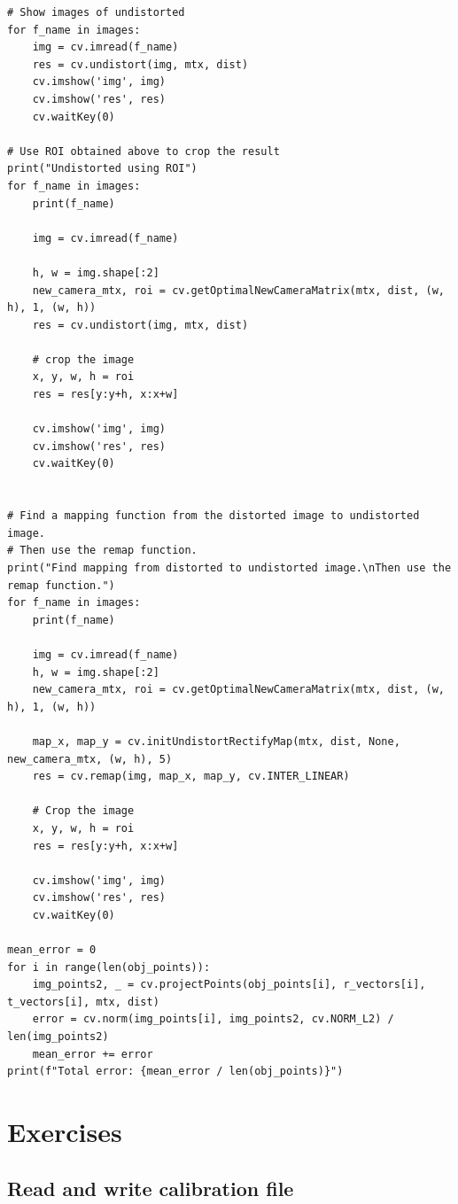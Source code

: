 \documentclass[a4paper, 12pt]{article}
\begin{document}
\begin{lstlisting}
# Show images of undistorted
for f_name in images:
    img = cv.imread(f_name)
    res = cv.undistort(img, mtx, dist)
    cv.imshow('img', img)
    cv.imshow('res', res)
    cv.waitKey(0)

# Use ROI obtained above to crop the result
print("Undistorted using ROI")
for f_name in images:
    print(f_name)

    img = cv.imread(f_name)

    h, w = img.shape[:2]
    new_camera_mtx, roi = cv.getOptimalNewCameraMatrix(mtx, dist, (w, h), 1, (w, h))
    res = cv.undistort(img, mtx, dist)

    # crop the image
    x, y, w, h = roi
    res = res[y:y+h, x:x+w]

    cv.imshow('img', img)
    cv.imshow('res', res)
    cv.waitKey(0)


# Find a mapping function from the distorted image to undistorted image.
# Then use the remap function.
print("Find mapping from distorted to undistorted image.\nThen use the remap function.")
for f_name in images:
    print(f_name)

    img = cv.imread(f_name)
    h, w = img.shape[:2]
    new_camera_mtx, roi = cv.getOptimalNewCameraMatrix(mtx, dist, (w, h), 1, (w, h))

    map_x, map_y = cv.initUndistortRectifyMap(mtx, dist, None, new_camera_mtx, (w, h), 5)
    res = cv.remap(img, map_x, map_y, cv.INTER_LINEAR)

    # Crop the image
    x, y, w, h = roi
    res = res[y:y+h, x:x+w]

    cv.imshow('img', img)
    cv.imshow('res', res)
    cv.waitKey(0)

mean_error = 0
for i in range(len(obj_points)):
    img_points2, _ = cv.projectPoints(obj_points[i], r_vectors[i], t_vectors[i], mtx, dist)
    error = cv.norm(img_points[i], img_points2, cv.NORM_L2) / len(img_points2)
    mean_error += error
print(f"Total error: {mean_error / len(obj_points)}")

	\end{lstlisting}

	\section{Exercises}
	\subsection{Read and write calibration file}
\end{document}
